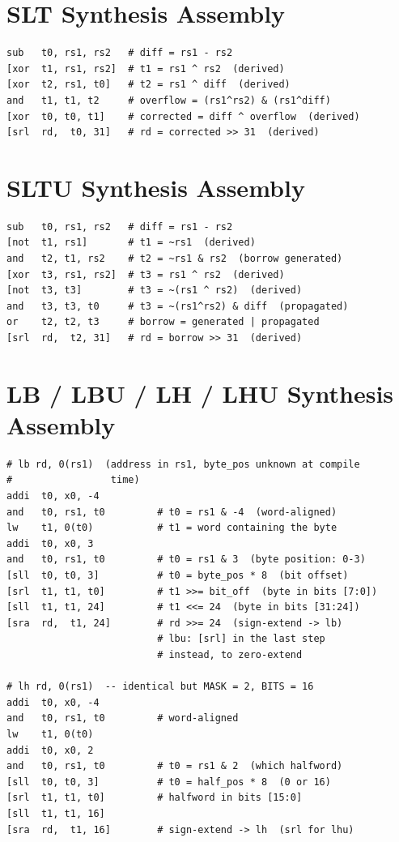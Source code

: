 \chapter{SLT Synthesis Assembly} \label{apx:slt-asm}

\begin{lstlisting}
sub   t0, rs1, rs2   # diff = rs1 - rs2
[xor  t1, rs1, rs2]  # t1 = rs1 ^ rs2  (derived)
[xor  t2, rs1, t0]   # t2 = rs1 ^ diff  (derived)
and   t1, t1, t2     # overflow = (rs1^rs2) & (rs1^diff)
[xor  t0, t0, t1]    # corrected = diff ^ overflow  (derived)
[srl  rd,  t0, 31]   # rd = corrected >> 31  (derived)
\end{lstlisting}


\chapter{SLTU Synthesis Assembly} \label{apx:sltu-asm}

\begin{lstlisting}
sub   t0, rs1, rs2   # diff = rs1 - rs2
[not  t1, rs1]       # t1 = ~rs1  (derived)
and   t2, t1, rs2    # t2 = ~rs1 & rs2  (borrow generated)
[xor  t3, rs1, rs2]  # t3 = rs1 ^ rs2  (derived)
[not  t3, t3]        # t3 = ~(rs1 ^ rs2)  (derived)
and   t3, t3, t0     # t3 = ~(rs1^rs2) & diff  (propagated)
or    t2, t2, t3     # borrow = generated | propagated
[srl  rd,  t2, 31]   # rd = borrow >> 31  (derived)
\end{lstlisting}


\chapter{LB / LBU / LH / LHU Synthesis Assembly} \label{apx:lb-lh-asm}

\begin{lstlisting}
# lb rd, 0(rs1)  (address in rs1, byte_pos unknown at compile
#                 time)
addi  t0, x0, -4
and   t0, rs1, t0         # t0 = rs1 & -4  (word-aligned)
lw    t1, 0(t0)           # t1 = word containing the byte
addi  t0, x0, 3
and   t0, rs1, t0         # t0 = rs1 & 3  (byte position: 0-3)
[sll  t0, t0, 3]          # t0 = byte_pos * 8  (bit offset)
[srl  t1, t1, t0]         # t1 >>= bit_off  (byte in bits [7:0])
[sll  t1, t1, 24]         # t1 <<= 24  (byte in bits [31:24])
[sra  rd,  t1, 24]        # rd >>= 24  (sign-extend -> lb)
                          # lbu: [srl] in the last step
                          # instead, to zero-extend

# lh rd, 0(rs1)  -- identical but MASK = 2, BITS = 16
addi  t0, x0, -4
and   t0, rs1, t0         # word-aligned
lw    t1, 0(t0)
addi  t0, x0, 2
and   t0, rs1, t0         # t0 = rs1 & 2  (which halfword)
[sll  t0, t0, 3]          # t0 = half_pos * 8  (0 or 16)
[srl  t1, t1, t0]         # halfword in bits [15:0]
[sll  t1, t1, 16]
[sra  rd,  t1, 16]        # sign-extend -> lh  (srl for lhu)
\end{lstlisting}


